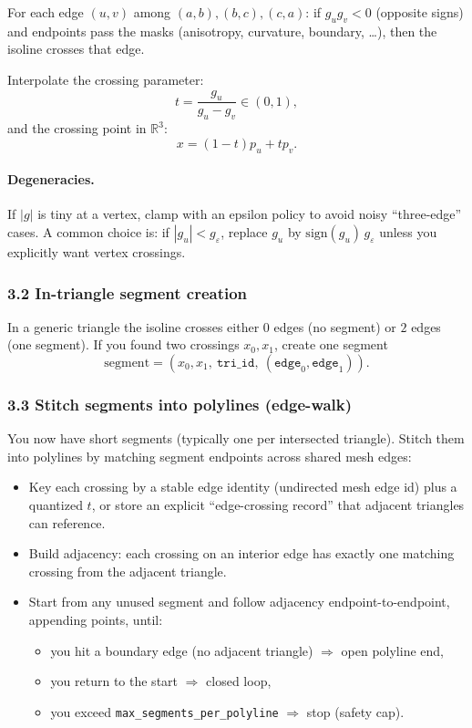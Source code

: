 \documentclass[12pt,a4paper]{article}
\theoremstyle{plain}
\theoremstyle{definition}      %
\begin{document}
	For each edge $(u,v)$ among $(a,b),(b,c),(c,a)$:
	if $g_u g_v<0$ (opposite signs) and endpoints pass the masks (anisotropy, curvature, boundary, \dots),
	then the isoline crosses that edge.
	
	Interpolate the crossing parameter:
	\[
	t=\frac{g_u}{g_u-g_v}\in(0,1),
	\]
	and the crossing point in $\mathbb{R}^3$:
	\[
	x=(1-t)p_u + t p_v.
	\]
	
	\paragraph{Degeneracies.}
	If $|g|$ is tiny at a vertex, clamp with an epsilon policy to avoid noisy ``three-edge'' cases.
	A common choice is: if $|g_u|<g_\varepsilon$, replace $g_u$ by $\mathrm{sign}(g_u)\,g_\varepsilon$
	unless you explicitly want vertex crossings.
	
	\subsubsection*{3.2 In-triangle segment creation}
	
	In a generic triangle the isoline crosses either $0$ edges (no segment) or $2$ edges (one segment).
	If you found two crossings $x_0,x_1$, create one segment
	\[
	\text{segment}=(x_0,x_1,\ \texttt{tri\_id},\ (\texttt{edge}_0,\texttt{edge}_1)).
	\]
	
	\subsubsection*{3.3 Stitch segments into polylines (edge-walk)}
	
	You now have short segments (typically one per intersected triangle). Stitch them into polylines
	by matching segment endpoints across shared mesh edges:
	
	\begin{itemize}
		\item Key each crossing by a stable edge identity (undirected mesh edge id) plus a quantized $t$,
		or store an explicit ``edge-crossing record'' that adjacent triangles can reference.
		\item Build adjacency: each crossing on an interior edge has exactly one matching crossing from the adjacent triangle.
		\item Start from any unused segment and follow adjacency endpoint-to-endpoint, appending points, until:
		\begin{itemize}
			\item you hit a boundary edge (no adjacent triangle) $\Rightarrow$ open polyline end,
			\item you return to the start $\Rightarrow$ closed loop,
			\item you exceed \texttt{max\_segments\_per\_polyline} $\Rightarrow$ stop (safety cap).
		\end{itemize}
	\end{itemize}
	
\end{document}

